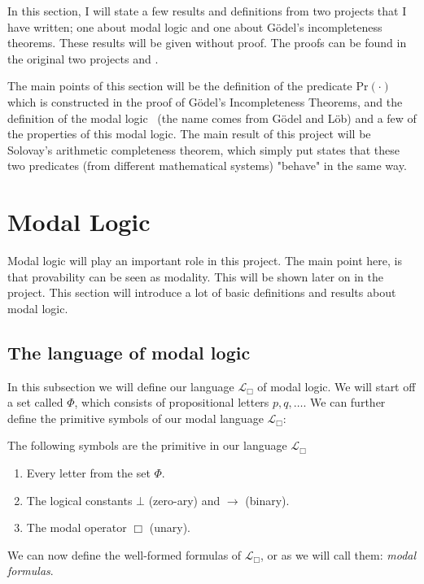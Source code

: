 \documentclass[../main.tex]{subfiles}
\begin{document}
In this section, I will state a few results and definitions from two projects that I have written; one about modal logic and one about Gödel's incompleteness
theorems.
These results will be given without proof. The proofs can be found in the
original 
two projects  \parencite{Thor2021} and \parencite{Thor2022}.

The main points of this section will be the definition of the predicate
$\text{Pr}(\cdot)$ which is constructed in the proof of  Gödel's Incompleteness
Theorems, and the definition of the modal logic \GL\
(the name comes from Gödel and Löb) and a few of the properties of this modal
logic. The
main result of this project will be Solovay's arithmetic completeness theorem,
which simply put states that these two predicates (from different mathematical
systems) "behave" in the
same way.

\section{Modal Logic}
Modal logic will play an important role in this project. The main point here,
is that provability can be seen as modality. This will be shown later on in
the project. This section will introduce a lot of basic definitions and results
about modal logic.

\subsection{The language of modal logic}
In this subsection we will define our language $\mathcal{L}_\Box$ of modal logic. 
We will start off  a  set called $\Phi$, which consists of propositional
letters
$p,q,\ldots$. We can further define the primitive symbols of our modal language
$\mathcal{L}_\Box$:

\begin{defi}
	The following symbols are the primitive in our language
	$\mathcal{L}_\Box$
	\begin{enumerate}
		\item Every letter from the set $\Phi$.
		\item The logical constants $\bot$ (zero-ary) and $\rightarrow$
			(binary).
		\item The modal operator $\Box$ (unary).
	\end{enumerate}
\end{defi}
We can now define the well-formed formulas of $\mathcal{L}_\Box$, or as we will
call them: \textit{modal formulas}.
\end{document}
